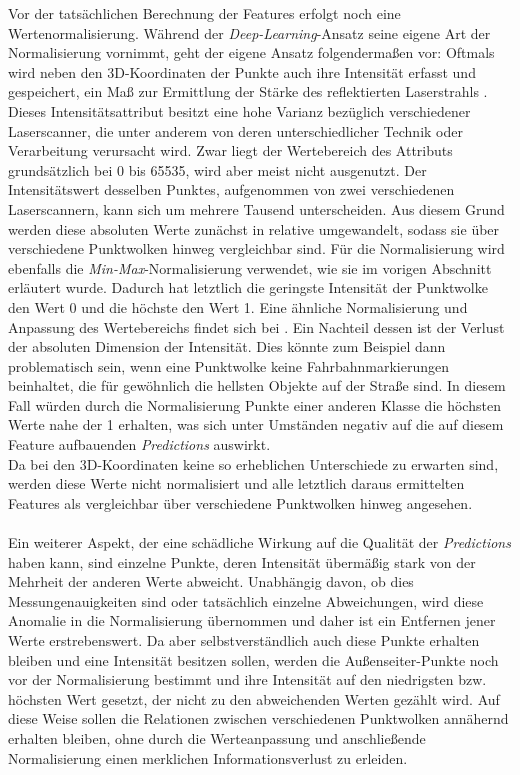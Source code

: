 Vor der tatsächlichen Berechnung der Features erfolgt noch eine Wertenormalisierung. Während der \textit{Deep-Learning}-Ansatz seine eigene Art der Normalisierung vornimmt, geht der eigene Ansatz folgendermaßen vor: 
Oftmals wird neben den 3D-Koordinaten der Punkte auch ihre Intensität erfasst und gespeichert, ein Maß zur Ermittlung der Stärke des reflektierten Laserstrahls \citep{Tatoglu.Pochiraju-2012}. Dieses Intensitätsattribut besitzt eine hohe Varianz bezüglich verschiedener Laserscanner, die unter anderem von deren unterschiedlicher Technik oder Verarbeitung verursacht wird. Zwar liegt der Wertebereich des Attributs grundsätzlich bei 0 bis 65535, wird aber meist nicht ausgenutzt. Der Intensitätswert desselben Punktes, aufgenommen von zwei verschiedenen Laserscannern, kann sich um mehrere Tausend unterscheiden. Aus diesem Grund werden diese absoluten Werte zunächst in relative umgewandelt, sodass sie über verschiedene Punktwolken hinweg vergleichbar sind. Für die Normalisierung wird ebenfalls die \textit{Min-Max}-Normalisierung verwendet, wie sie im vorigen Abschnitt erläutert wurde. Dadurch hat letztlich die geringste Intensität der Punktwolke den Wert 0 und die höchste den Wert 1. Eine ähnliche Normalisierung und Anpassung des Wertebereichs findet sich bei \cite{Li.Cheng-2018}. Ein Nachteil dessen ist der Verlust der absoluten Dimension der Intensität. Dies könnte zum Beispiel dann problematisch sein, wenn eine Punktwolke keine Fahrbahnmarkierungen beinhaltet, die für gewöhnlich die hellsten Objekte auf der Straße sind. In diesem Fall würden durch die Normalisierung Punkte einer anderen Klasse die höchsten Werte nahe der 1 erhalten, was sich unter Umständen negativ auf die auf diesem Feature aufbauenden \textit{Predictions} auswirkt. \\
Da bei den 3D-Koordinaten keine so erheblichen Unterschiede zu erwarten sind, werden diese Werte nicht normalisiert und alle letztlich daraus ermittelten Features als vergleichbar über verschiedene Punktwolken hinweg angesehen. \\\\
Ein weiterer Aspekt, der eine schädliche Wirkung auf die Qualität der \textit{Predictions} haben kann, sind einzelne Punkte, deren Intensität übermäßig stark von der Mehrheit der anderen Werte abweicht. Unabhängig davon, ob dies Messungenauigkeiten sind oder tatsächlich einzelne Abweichungen, wird diese Anomalie in die Normalisierung übernommen und daher ist ein Entfernen jener Werte erstrebenswert. Da aber selbstverständlich auch diese Punkte erhalten bleiben und eine Intensität besitzen sollen, werden die Außenseiter-Punkte noch vor der Normalisierung bestimmt und ihre Intensität auf den niedrigsten bzw. höchsten Wert gesetzt, der nicht zu den abweichenden Werten gezählt wird. Auf diese Weise sollen die Relationen zwischen verschiedenen Punktwolken annähernd erhalten bleiben, ohne durch die Werteanpassung und anschließende Normalisierung einen merklichen Informationsverlust zu erleiden. \\
